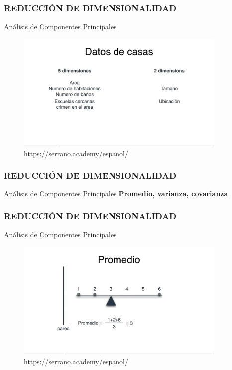 \documentclass{beamer}
\begin{document}
\begin{frame}
	\frametitle{REDUCCIÓN DE DIMENSIONALIDAD}
	\begin{block}{Análisis de Componentes Principales}	
		\begin{figure}
			\includegraphics[width=0.9\textwidth]{PCA/IMG_3542.jpg}
			\caption{https://serrano.academy/espanol/}
		\end{figure}
	\end{block}
\end{frame}


\begin{frame}
	\frametitle{REDUCCIÓN DE DIMENSIONALIDAD}
	\begin{block}{Análisis de Componentes Principales}	
		\textbf{Promedio, varianza, covarianza}
	\end{block}
\end{frame}

\begin{frame}
	\frametitle{REDUCCIÓN DE DIMENSIONALIDAD}
	\begin{block}{Análisis de Componentes Principales}	
		\begin{figure}
			\includegraphics[width=0.9\textwidth]{PCA/IMG_3544.jpg}
			\caption{https://serrano.academy/espanol/}
		\end{figure}
	\end{block}
\end{frame}
\end{document}
